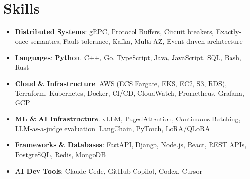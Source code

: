 \documentclass[letterpaper,11pt]{article}
\newcommand{\resumeSubHeadingListStart}{\begin{itemize}[leftmargin=0.15in, label={}]}
\newcommand{\resumeSubHeadingListEnd}{\end{itemize}}
\newcommand{\resumeSkillHeading}[2]{%
  \item\small{\textbf{#1}: #2 \vspace{-9pt}}%
}
\begin{document}
\section{Skills}
  \resumeSubHeadingListStart
    \resumeSkillHeading{Distributed Systems}{gRPC, Protocol Buffers, Circuit breakers, Exactly-once semantics, Fault tolerance, Kafka, Multi-AZ, Event-driven architecture}
    \resumeSkillHeading{Languages}{\textbf{Python}, C++, Go, TypeScript, Java, JavaScript, SQL, Bash, Rust}
    \resumeSkillHeading{Cloud \& Infrastructure}{AWS (ECS Fargate, EKS, EC2, S3, RDS), Terraform, Kubernetes, Docker, CI/CD, CloudWatch, Prometheus, Grafana, GCP}
    \resumeSkillHeading{ML \& AI Infrastructure}{vLLM, PagedAttention, Continuous Batching, LLM-as-a-judge evaluation, LangChain, PyTorch, LoRA/QLoRA}
    \resumeSkillHeading{Frameworks \& Databases}{FastAPI, Django, Node.js, React, REST APIs, PostgreSQL, Redis, MongoDB}
    \resumeSkillHeading{AI Dev Tools}{Claude Code, GitHub Copilot, Codex, Cursor}
  \resumeSubHeadingListEnd
\end{document}
